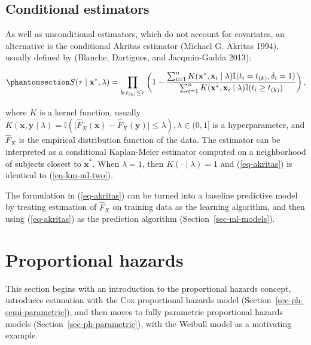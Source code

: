 \documentclass[
  letterpaper,
  krantz2]{style/krantz}
\begin{document}
\subsection{Conditional estimators}\label{conditional-estimators}

As well as unconditional estimators, which do not account for
covariates, an alternative is the conditional Akritas estimator (Michael
G. Akritas 1994), usually defined by (Blanche, Dartigues, and
Jacqmin-Gadda 2013):

\begin{equation}\phantomsection\label{eq-akritas}{
S(\tau \mid \mathbf{x}^*, \lambda) = \prod_{k:t_{(k)}\leq \tau} \left(1 - \frac{\sum^n_{i=1} K(\mathbf{x}^*,\mathbf{x}_i \mid \lambda)\mathbb{I}(t_i = t_{(k)}, \delta_i = 1)}{\sum^n_{i=1} K(\mathbf{x}^*,\mathbf{x}_i \mid \lambda)\mathbb{I}(t_i \geq t_{(k)})}\right),
}\end{equation}

where \(K\) is a kernel function, usually
\(K(\mathbf{x},\mathbf{y}\mid \lambda) = \mathbb{I}(\lvert \hat{F}_X(\mathbf{x}) - \hat{F}_X(\mathbf{y})\rvert \leq \lambda), \lambda \in (0, 1]\)
is a hyperparameter, and \(\hat{F}_X\) is the empirical distribution
function of the data. The estimator can be interpreted as a conditional
Kaplan-Meier estimator computed on a neighborhood of subjects closest to
\(\mathbf{x}^*\). When \(\lambda = 1\), then
\(K(\cdot \mid \lambda) = 1\) and (\ref{eq-akritas}) is identical to
(\ref{eq-km-ml-two}).

The formulation in (\ref{eq-akritas}) can be turned into a baseline
predictive model by treating estimation of \(\hat{F}_X\) on training
data as the learning algorithm, and then using (\ref{eq-akritas}) as the
prediction algorithm (Section~\ref{sec-ml-models}).

\section{Proportional hazards}\label{sec-classical-cox}

This section begins with an introduction to the proportional hazards
concept, introduces estimation with the Cox
proportional hazards model
(Section~\ref{sec-ph-semi-parametric}), and then moves to fully
parametric proportional hazards models
(Section~\ref{sec-ph-parametric}), with the Weibull model as a
motivating example.
\end{document}
